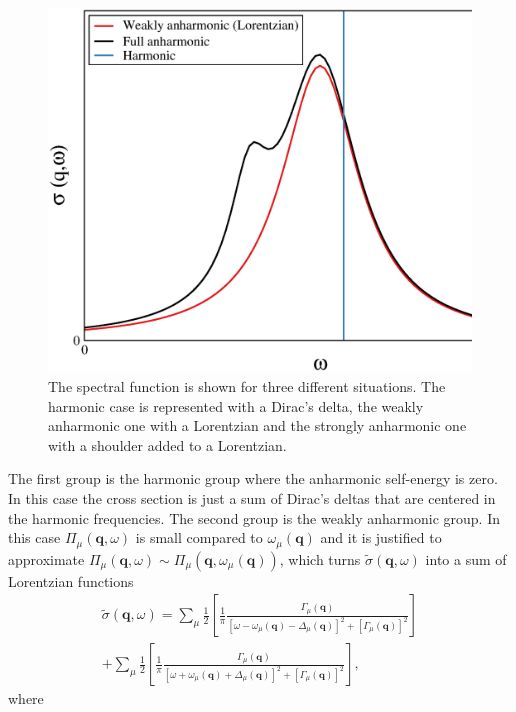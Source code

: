\begin{figure}[h]
\begin{center}
\includegraphics[width=0.8\linewidth]{Figures/ins-toy.eps}
\caption[Spectral function for different levels of anharmonicity]{The spectral function is shown for three different situations. The harmonic case is represented with a Dirac's delta, the weakly anharmonic one with a 
Lorentzian and the strongly anharmonic one with a shoulder added to a Lorentzian.}
\label{instoy}
\end{center}
\end{figure}
The first group is the harmonic group where the anharmonic self-energy is zero. In this case the cross section is just a sum of Dirac's deltas that are centered in the harmonic frequencies. The second group is the weakly
anharmonic group. In this case $\Pi_{\mu}(\mathbf{q},\omega)$ is small compared to $\omega_{\mu}(\mathbf{q})$ and it is justified to approximate 
$\Pi_{\mu}(\mathbf{q},\omega)\sim\Pi_{\mu}(\mathbf{q},\omega_{\mu}(\mathbf{q}))$, which turns $\tilde{\sigma}(\mathbf{q},\omega)$ into a sum of Lorentzian functions
\begin{multline}
 \tilde{\sigma}(\mathbf{q},\omega)=\sum_{\mu}\frac{1}{2}\left[\frac{1}{\pi}\frac{\Gamma_{\mu}(\mathbf{q})}{[\omega-\omega_{\mu}(\mathbf{q})-\Delta_{\mu}(\mathbf{q})]^{2}+[\Gamma_{\mu}(\mathbf{q})]^{2}}\right]\\+\sum_{
 \mu}\frac{1}{2}\left[\frac{1}{\pi}\frac{\Gamma_{\mu}(\mathbf{q})}{[\omega+\omega_{\mu}(\mathbf{q})+\Delta_{\mu}(\mathbf{q})]^{2}+[\Gamma_{\mu}(\mathbf{q})]^{2}}\right],
\end{multline}
where
